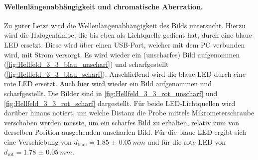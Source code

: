 \documentclass[english, ngerman]{scrartcl}
\begin{document}
\paragraph{Wellenlängenabhängigkeit und chromatische Aberration.}
Zu guter Letzt wird die Wellenlängenabhängigkeit des Bilds untersucht. Hierzu wird die Halogenlampe, die bis eben als Lichtquelle gedient hat, durch eine blaue LED ersetzt. Diese wird über einen USB-Port, welcher mit dem PC verbunden wird, mit Strom versorgt. Es wird wieder ein (unscharfes) Bild aufgenommen (\autoref{fig:Hellfeld_3_3_blau_unscharf}) und scharfgestellt (\autoref{fig:Hellfeld_3_3_blau_scharf}). Anschließend wird die blaue LED durch eine rote LED ersetzt. Auch hier wird wieder ein Bild aufgenommen und scharfgestellt. Die Bilder sind in \autoref{fig:Hellfeld_3_3_rot_unscharf} und \autoref{fig:Hellfeld_3_3_rot_scharf} dargestellt. Für beide LED-Lichtquellen wird darüber hinaus notiert, um welche Distanz die Probe mittels Mikrometerschraube verschoben werden musste, um ein scharfes Bild zu erhalten, relativ zum von derselben Position ausgehenden unscharfen Bild. Für die blaue LED ergibt sich eine Verschiebung von $d_{\text{blau}}=\SI{1.85(5)}{mm}$ und für die rote LED von $d_{\text{rot}}=\SI{1.78(5)}{mm}$.
%
\setcapindent{0pt}
\end{document}
